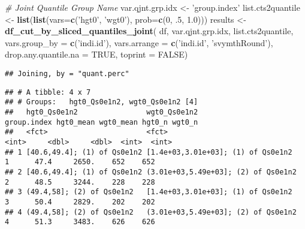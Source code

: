 \documentclass[
]{article}
\newenvironment{Shaded}{\begin{snugshade}}{\end{snugshade}}
\newcommand{\CommentTok}[1]{\textcolor[rgb]{0.56,0.35,0.01}{\textit{#1}}}
\newcommand{\DataTypeTok}[1]{\textcolor[rgb]{0.13,0.29,0.53}{#1}}
\newcommand{\DecValTok}[1]{\textcolor[rgb]{0.00,0.00,0.81}{#1}}
\newcommand{\FloatTok}[1]{\textcolor[rgb]{0.00,0.00,0.81}{#1}}
\newcommand{\KeywordTok}[1]{\textcolor[rgb]{0.13,0.29,0.53}{\textbf{#1}}}
\newcommand{\NormalTok}[1]{#1}
\newcommand{\OperatorTok}[1]{\textcolor[rgb]{0.81,0.36,0.00}{\textbf{#1}}}
\newcommand{\OtherTok}[1]{\textcolor[rgb]{0.56,0.35,0.01}{#1}}
\newcommand{\StringTok}[1]{\textcolor[rgb]{0.31,0.60,0.02}{#1}}
\begin{document}
\begin{Shaded}
\begin{Highlighting}[]
\CommentTok{# Joint Quantile Group Name}
\NormalTok{var.qjnt.grp.idx <-}\StringTok{ 'group.index'}
\NormalTok{list.cts2quantile <-}\StringTok{ }\KeywordTok{list}\NormalTok{(}\KeywordTok{list}\NormalTok{(}\DataTypeTok{vars=}\KeywordTok{c}\NormalTok{(}\StringTok{'hgt0'}\NormalTok{, }\StringTok{'wgt0'}\NormalTok{), }\DataTypeTok{prob=}\KeywordTok{c}\NormalTok{(}\DecValTok{0}\NormalTok{, }\FloatTok{.5}\NormalTok{, }\FloatTok{1.0}\NormalTok{)))}
\NormalTok{results <-}\StringTok{ }\KeywordTok{df_cut_by_sliced_quantiles_joint}\NormalTok{(}
\NormalTok{  df, var.qjnt.grp.idx, list.cts2quantile,}
  \DataTypeTok{vars.group_by =} \KeywordTok{c}\NormalTok{(}\StringTok{'indi.id'}\NormalTok{), }\DataTypeTok{vars.arrange =} \KeywordTok{c}\NormalTok{(}\StringTok{'indi.id'}\NormalTok{, }\StringTok{'svymthRound'}\NormalTok{),}
  \DataTypeTok{drop.any.quantile.na =} \OtherTok{TRUE}\NormalTok{, }\DataTypeTok{toprint =} \OtherTok{FALSE}\NormalTok{)}
\end{Highlighting}
\end{Shaded}

\begin{verbatim}
## Joining, by = "quant.perc"
\end{verbatim}

\begin{Shaded}
\end{Shaded}

\begin{verbatim}
## # A tibble: 4 x 7
## # Groups:   hgt0_Qs0e1n2, wgt0_Qs0e1n2 [4]
##   hgt0_Qs0e1n2                wgt0_Qs0e1n2                        group.index hgt0_mean wgt0_mean hgt0_n wgt0_n
##   <fct>                       <fct>                                     <int>     <dbl>     <dbl>  <int>  <int>
## 1 [40.6,49.4]; (1) of Qs0e1n2 [1.4e+03,3.01e+03]; (1) of Qs0e1n2            1      47.4     2650.    652    652
## 2 [40.6,49.4]; (1) of Qs0e1n2 (3.01e+03,5.49e+03]; (2) of Qs0e1n2           2      48.5     3244.    228    228
## 3 (49.4,58]; (2) of Qs0e1n2   [1.4e+03,3.01e+03]; (1) of Qs0e1n2            3      50.4     2829.    202    202
## 4 (49.4,58]; (2) of Qs0e1n2   (3.01e+03,5.49e+03]; (2) of Qs0e1n2           4      51.3     3483.    626    626
\end{verbatim}
\end{document}
